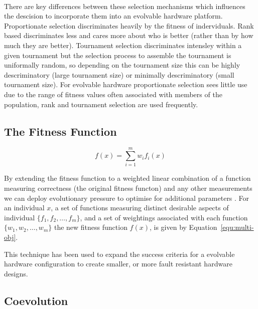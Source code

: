 \paragraph{}
There are key differences between these selection mechanisms which influences
the descision to incorporate them into an evolvable hardware platform. Proportionate
selection discriminates heavily by the fitness of inderviduals. Rank based
discriminates less and cares more about who is better (rather than by how
much they are better). Tournament selection discriminates intensley within a given
tournament but the selection process to assemble the tournament is uniformally
random, so depending on the tournament size this can be highly descriminatory
(large tournament size) or minimally descriminatory (small tournament size).
For evolvable hardware proportionate selection sees little use due to the range
of fitness values often associated with members of the population, rank and
tournament selection are used frequently.

\subsection{The Fitness Function}

\begin{equation}
	f(x) = \sum_{i=1}^{m} w_i f_i(x)
	\label{equ:multi-obj}
\end{equation}

By extending the fitness function to a weighted linear combination of a function
measuring correctness (the original fitness functon)
and any other measurements we can deploy evolutionary pressure to optimise for
additional parameters \cite{deJong:2001:RBP:2955239.2955241}. For an individual
$x$, a set of functions measuring distinct desirable aspects of individual
$\{f_1,f_2,\ldots,f_m\}$, and a set of weightings associated with each function
$\{w_1,w_2,\ldots,w_m\}$ the new fitness function $f(x)$, is given by
Equation~\ref{equ:multi-obj}.

This technique has been used to expand the success criteria for a evolvable hardware configuration
to create smaller, or more fault resistant hardware designs.

\subsection{Coevolution}

